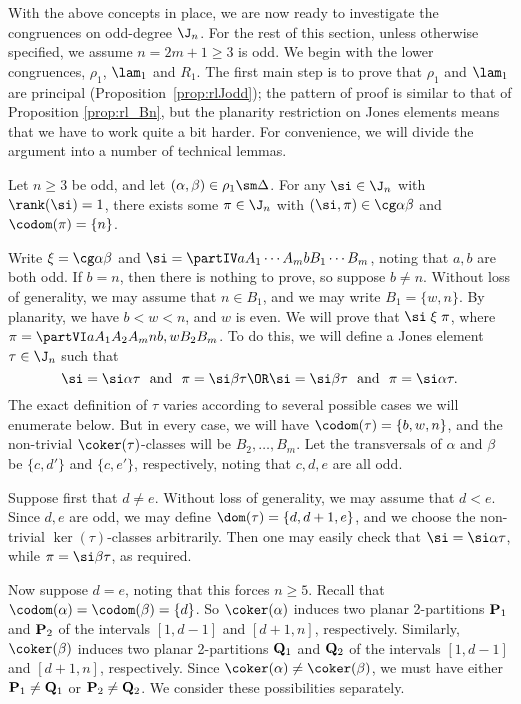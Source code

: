 With the above concepts in place, we are now ready to investigate the congruences on odd-degree $\J_n$.
%
For the rest of this section, unless otherwise specified, we assume $n=2m+1\geq3$ is odd.  
%
We begin with the lower congruences, $\rho_1$, $\lam_1$ and $R_1$.  The first main step is to prove that $\rho_1$ and $\lam_1$ are principal (Proposition~\ref{prop:rlJodd}); the pattern of proof is similar to that of Proposition \ref{prop:rl_Bn}, but the planarity restriction on Jones elements means that we have to work quite a bit harder.  For convenience, we will divide the argument into a number of technical lemmas.


\begin{lemma}\label{lem:bzn}
Let $n\geq3$ be odd, and let $(\alpha,\beta)\in\rho_1\sm\Delta$.  For any $\si\in\J_n$ with $\rank(\si)=1$, there exists some $\pi\in\J_n$ with $(\si,\pi)\in\cg\alpha\beta$ and $\codom(\pi)=\{n\}$.
\end{lemma}

\pf Write ${\mathrel\xi}=\cg\alpha\beta$ and $\si=\partIV
a{A_1}\cdots{A_m}b{B_1}\cdots{B_m}$, noting that $a,b$ are both odd.  If $b=n$, then there is nothing to prove,
so suppose $b\not=n$.  Without loss of generality, we may assume that $n\in B_1$, and we may write $B_1=\{w,n\}$.  By planarity, we have $b<w<n$, and $w$ is even.  
%
We will prove that $\si\mathrel\xi\pi$, where $\pi=\partVI a{A_1}{A_2}{A_m}n{b,w}{B_2}{B_m}$.
To do this, we will define a Jones element $\tau\in\J_n$ such that 
\begin{equation}\label{eq:bzn}
\si = \si\alpha\tau \ \ \text{and} \ \ \pi = \si\beta\tau
\OR
\si = \si\beta\tau \ \ \text{and} \ \  \pi = \si\alpha\tau.
\end{equation}
The exact definition of $\tau$ varies according to several possible cases we will enumerate below.  But in every case, we will have $\codom(\tau)=\{b,w,n\}$, and the non-trivial $\coker(\tau)$-classes will be $B_2,\ldots,B_m$.  
%
Let the transversals of $\alpha$ and $\beta$ be $\{c,d'\}$ and $\{c,e'\}$, respectively, noting that $c,d,e$ are all odd.  

\bigskip{}  Suppose first that $d\not=e$.  Without loss of generality, we may assume that $d<e$.  Since $d,e$ are odd, we may define $\dom(\tau)=\{d,d+1,e\}$, and we choose the non-trivial $\ker(\tau)$-classes arbitrarily.  
%
Then one may easily check that $\si=\si\alpha\tau$, while $\pi=\si\beta\tau$, as required.  

\bigskip{}  Now suppose $d=e$, noting that this forces $n\geq5$.  
%
Recall that $\codom(\alpha)=\codom(\beta)=\{d\}$.  So $\coker(\alpha)$ induces two planar 2-partitions ${\bf P}_1$ and ${\bf P}_2$ of the intervals $[1,d-1]$ and $[d+1,n]$, respectively.  Similarly, $\coker(\beta)$ induces two planar 2-partitions ${\bf Q}_1$ and ${\bf Q}_2$ of the intervals $[1,d-1]$ and $[d+1,n]$, respectively.  Since $\coker(\alpha)\not=\coker(\beta)$, we must have either ${\bf P}_1\not={\bf Q}_1$ or ${\bf P}_2\not={\bf Q}_2$.  We consider these possibilities separately.

